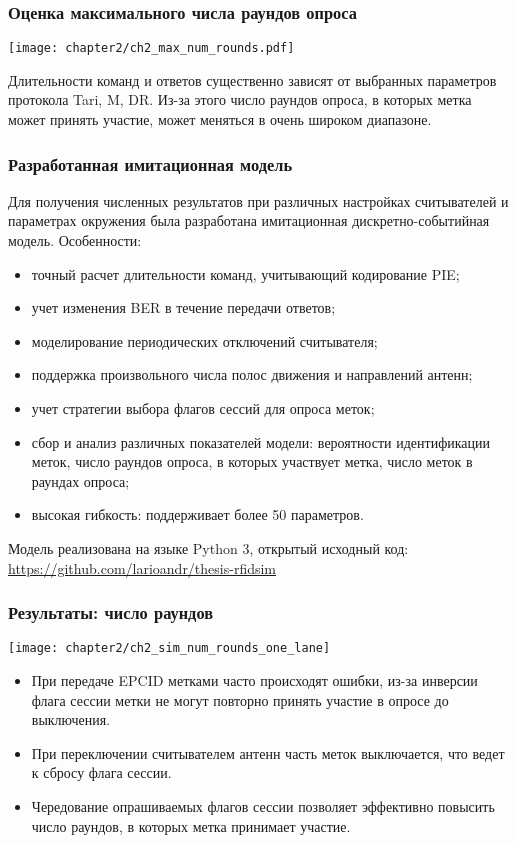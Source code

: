 \begin{frame}
    \frametitle{Оценка максимального числа раундов опроса}
    \begin{center}
        \texttt{[image: chapter2/ch2\_max\_num\_rounds.pdf]}
    \end{center}
    Длительности команд и ответов существенно зависят от выбранных параметров протокола Tari, M, DR. Из-за этого число раундов опроса, в которых метка может принять участие, может меняться в очень широком диапазоне.
\end{frame}

\begin{frame}
    \frametitle{Разработанная имитационная модель}
    Для получения численных результатов при различных настройках считывателей и параметрах окружения была разработана имитационная дискретно-событийная модель. Особенности:

    \begin{itemize}
        \item точный расчет длительности команд, учитывающий кодирование PIE;
        \item учет изменения BER в течение передачи ответов;
        \item моделирование периодических отключений считывателя;
        \item поддержка произвольного числа полос движения и направлений антенн;
        \item учет стратегии выбора флагов сессий для опроса меток;
        \item сбор и анализ различных показателей модели: вероятности идентификации меток, число раундов опроса, в которых участвует метка, число меток в раундах опроса;
        \item высокая гибкость: поддерживает более 50 параметров.
    \end{itemize}

    Модель реализована на языке Python 3, открытый исходный код: \url{https://github.com/larioandr/thesis-rfidsim}
\end{frame}

\begin{frame}
    \frametitle{Результаты: число раундов}
    \begin{center}
        \texttt{[image: chapter2/ch2\_sim\_num\_rounds\_one\_lane]}
    \end{center}
    \begin{itemize}
    \item При передаче EPCID метками часто происходят ошибки, из-за инверсии флага сессии метки не могут повторно принять участие в опросе до выключения.
    \item При переключении считывателем антенн часть меток выключается, что ведет к сбросу флага сессии.
    \item Чередование опрашиваемых флагов сессии позволяет эффективно повысить число раундов, в которых метка принимает участие.
    \end{itemize}
\end{frame}

